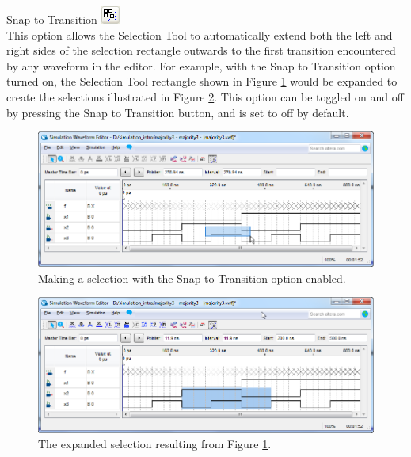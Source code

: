 \documentclass[11pt, twoside, pdftex]{article}
\begin{document}
\begin{description}
	\item {\sf Snap to Transition} \hbox{\includegraphics[scale=0.7]{figures/appendix/icon15.png}}\\
	This option allows the {\sf Selection Tool} to automatically extend both the left and right sides of the selection rectangle outwards to the first transition encountered by any waveform in the editor. For example, with the {\sf Snap to Transition} option turned on, the {\sf Selection Tool} rectangle
	shown in Figure \ref{fig:fig19} would be expanded to create the selections illustrated in Figure \ref{fig:fig20}.
	This option can be toggled on and off by pressing the {\sf Snap to Transition} button, and is set to off 
	by default.
	\begin{figure}[H]
	   \begin{center}
	      \includegraphics[scale=0.65]{figures/appendix/figure19.png}
	   \caption{Making a selection with the {\sf Snap to Transition} option enabled.} 
		 \label{fig:fig19}
		 \end{center}
	\end{figure}
	\begin{figure}[H]
	   \begin{center}
	      \includegraphics[scale=0.65]{figures/appendix/figure20.png}
	   \caption{The expanded selection resulting from Figure \ref{fig:fig19}.} 
		 \label{fig:fig20}
		 \end{center}
	\end{figure}
	
\end{description}
\end{document}
